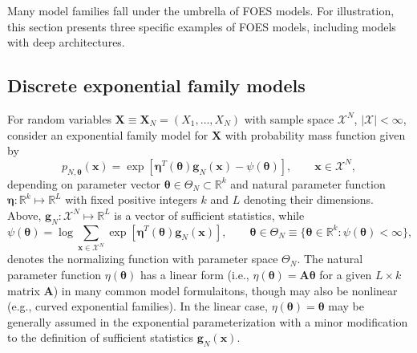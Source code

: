 \documentclass[12pt]{article}
\theoremstyle{definition}
\begin{document}
Many model families fall under the umbrella of FOES models. For illustration, this section presents three specific examples of FOES models, including models with deep architectures.

\subsection{Discrete exponential family models}
\label{discrete-exponential-family-models}

For  random variables $\boldsymbol X \equiv\boldsymbol X_N= (X_1, \dots, X_N)$ with sample space $\mathcal{X}^N$, $|\mathcal{X}| < \infty$, consider an exponential family model for $\boldsymbol X$ with probability mass function given by
\begin{equation}
\label{eqn:expo}
p_{N, \boldsymbol \theta}(\boldsymbol x) = \exp\left[\boldsymbol\eta^T(\boldsymbol \theta) \boldsymbol g_N(\boldsymbol x) - \psi(\boldsymbol \theta)\right], \qquad \boldsymbol x \in \mathcal{X}^N,
\end{equation}
depending on parameter vector $\boldsymbol \theta \in \Theta_N \subset \mathbb{R}^{k}$ and natural parameter function $\boldsymbol \eta : \mathbb{R}^k \mapsto \mathbb{R}^L$ with fixed positive integers $k$ and $L$ denoting their dimensions. Above, $\boldsymbol g_N : \mathcal{X}^N \mapsto \mathbb{R}^L$ is a vector of sufficient statistics, while
$$
\psi(\boldsymbol \theta) = \log \sum\limits_{\boldsymbol x \in \mathcal{X}^N}\exp\left[\boldsymbol \eta^T(\boldsymbol \theta) \boldsymbol g_N(\boldsymbol x) \right], \qquad \boldsymbol \theta \in \Theta_N\equiv \{\boldsymbol \theta \in \mathbb{R}^k : \psi(\boldsymbol \theta) < \infty \},
$$
denotes the normalizing function with   parameter space $\Theta_N$.   The natural parameter function $\eta (\boldsymbol \theta) $  has a linear form (i.e., $\eta (\boldsymbol \theta)= \bm{A} \boldsymbol \theta$ for a given $L \times k$ matrix $\bm{A}$) in many common model formulaitons, though may also be nonlinear (e.g., curved exponential families).  In the linear case, $\eta (\boldsymbol \theta) =\boldsymbol \theta$ may be generally assumed in the exponential parameterization with a minor modification to the definition of sufficient statistics $\boldsymbol g_N(\boldsymbol x)$.
\end{document}
